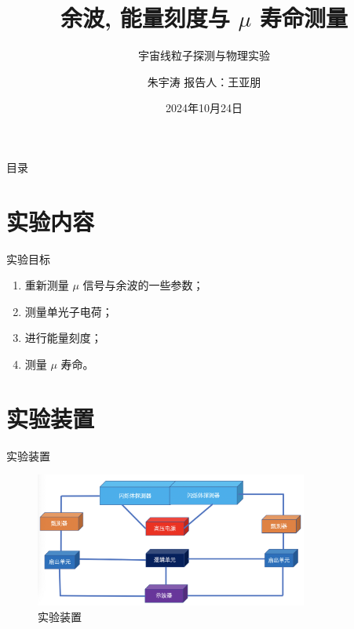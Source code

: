 \documentclass[10pt]{beamer}
\author{朱宇涛 \quad 报告人：王亚朋}
\date{2024年10月24日}
\title{余波, 能量刻度与 \(\mu\) 寿命测量}
\subtitle{宇宙线粒子探测与物理实验}
\begin{document}
\maketitle
\begin{frame}[label={sec:orgba24ec1}]{目录}
\tableofcontents
\end{frame}
\section{实验内容}
\label{sec:org8985ec5}
\begin{frame}[label={sec:org1c7c6fd}]{实验目标}
\begin{enumerate}
\item 重新测量 \(\mu\) 信号与余波的一些参数；
\item 测量单光子电荷；
\item 进行能量刻度；
\item 测量 \(\mu\) 寿命。
\end{enumerate}
\end{frame}
\section{实验装置}
\label{sec:org0b80238}
\begin{frame}[label={sec:org1295a78}]{实验装置}
\begin{figure}[htbp]
\centering
\includegraphics[width=0.8\textwidth]{img/Ex02_20241024164303.png}
\caption{实验装置}
\end{figure}
\end{frame}
\end{document}
